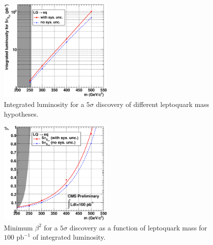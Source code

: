\begin{figure}[h!]
 \centering
  \includegraphics[width=0.5\textwidth]{plots/cmsPotential/L5sigma_vs_m_log.eps}
 \caption{Integrated luminosity
for a $5\sigma$ discovery of different leptoquark mass hypotheses.\label{fig:discovery}}
\end{figure}
\begin{figure}[h!]
 \centering
  \includegraphics[width=0.5\textwidth]{plots/cmsPotential/beta2_vs_m.eps}
 \caption{Minimum $\beta^2$ for
a $5\sigma$ discovery as a function of leptoquark mass for $100\text{ pb}^{-1}$ of integrated luminosity.\label{fig:discovery_beta}}
\end{figure}

